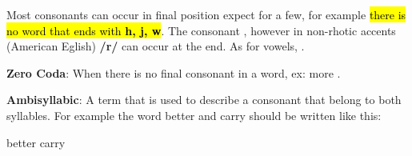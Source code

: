\documentclass[12pt, a4paper]{article}
\begin{document}
{Most consonants can occur in final position expect for a few, for example
\hl{there is no word that ends with \textbf{h, j, w}}. 
The consonant , however in non-rhotic accents (American Eglish) 
\textbf{/r/} can occur at the end. As for vowels, 
.\medbreak


\textbf{Zero Coda}: When there is no final consonant in a word, ex:
more .\medbreak

\textbf{Ambisyllabic}: A term that is used to describe a consonant 
that belong to both syllables. For example the word better and carry 
should be written like this:\medbreak

\centerline{better \hspace{2cm}carry }
\medbreak

}
\end{document}
